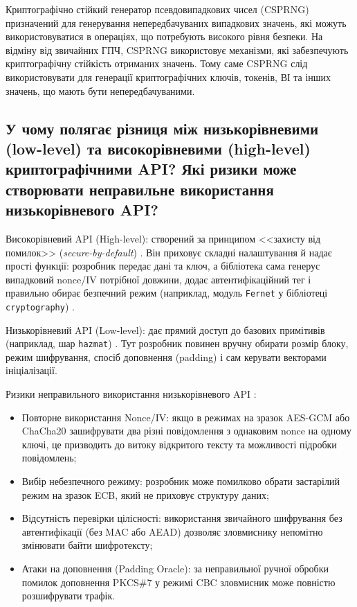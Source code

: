 Криптографічно стійкий генератор псевдовипадкових чисел (CSPRNG) призначений для генерування непередбачуваних випадкових значень, 
які можуть використовуватися в операціях, що потребують високого рівня безпеки. На відміну від звичайних ГПЧ, CSPRNG використовує механізми, 
які забезпечують криптографічну стійкість отриманих значень. Тому саме CSPRNG слід використовувати для генерації криптографічних ключів, токенів, 
ВІ та інших значень, що мають бути непередбачуваними. \cite{OWASP}


\subsection{У чому полягає різниця між низькорівневими (low-level) та високорівневими (high-level) криптографічними API? Які ризики може створювати неправильне використання низькорівневого API?}

Високорівневий API (High-level): створений за принципом <<захисту від помилок>> (\textit{secure-by-default}) \cite{Tink}. Він приховує складні налаштування й надає прості функції: розробник передає дані та ключ, а бібліотека сама генерує випадковий nonce/IV потрібної довжини, додає автентифікаційний тег і правильно обирає безпечний режим (наприклад, модуль \texttt{Fernet} у бібліотеці \texttt{cryptography}) \cite{cryptography}.
 
Низькорівневий API (Low-level): дає прямий доступ до базових примітивів (наприклад, шар \texttt{hazmat}) \cite{cryptography, cryptography git}. Тут розробник повинен вручну обирати розмір блоку, режим шифрування, спосіб доповнення (padding) і сам керувати векторами ініціалізації.


Ризики неправильного використання низькорівневого API \cite{OWASP, Libsodium}:
\begin{itemize}
    \item Повторне використання Nonce/IV: якщо в режимах на зразок AES-GCM або ChaCha20 зашифрувати два різні повідомлення з однаковим nonce на одному ключі, це призводить до витоку відкритого тексту та можливості підробки повідомлень;
    \item Вибір небезпечного режиму: розробник може помилково обрати застарілий режим на зразок ECB, який не приховує структуру даних;
    \item Відсутність перевірки цілісності: використання звичайного шифрування без автентифікації (без MAC або AEAD) дозволяє зловмиснику непомітно змінювати байти шифротексту;
    \item Атаки на доповнення (Padding Oracle): за неправильної ручної обробки помилок доповнення PKCS\#7 у режимі CBC зловмисник може повністю розшифрувати трафік.
\end{itemize}


